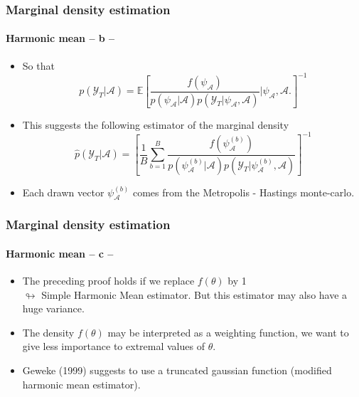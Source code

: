 \documentclass[10pt,slidestop]{beamer}
\newcommand{\sample}{\mathcal Y_T}
\begin{document}
\begin{frame}
  \frametitle{Marginal density estimation}
  \framesubtitle{Harmonic mean -- b --}


    \begin{itemize}
        \item So that
        \[
            p(\sample|\mathcal A)=\mathbb{E}\left[\frac{f(\psi_{\mathcal
A})}{p(\psi_{\mathcal A}|\mathcal A)
            p(\sample|\psi_{\mathcal A},\mathcal A)}\biggl|\psi_{\mathcal A},\mathcal
A\biggr.\right]^{-1}
        \]

\bigskip

        \item This suggests the following estimator of the marginal
        density
        \[
            \widehat{p}(\sample|\mathcal A)= \left[\frac{1}{B}\sum_{b=1}^B
            \frac{f(\psi_{\mathcal A}^{(b)})}{p(\psi_{\mathcal A}^{(b)}|\mathcal A)
            p(\sample|\psi_{\mathcal A}^{(b)},\mathcal A)}\right]^{-1}
        \]

\bigskip

        \item Each drawn vector $\psi_{\mathcal A}^{(b)}$ comes from the
        Metropolis - Hastings monte-carlo.

\end{itemize}

\end{frame}


\begin{frame}
  \frametitle{Marginal density estimation}
  \framesubtitle{Harmonic mean -- c --}

    \begin{itemize}
        \item The preceding proof holds if we replace
        $f(\theta)$ by 1\\ $\looparrowright$ Simple Harmonic Mean
        estimator. But this estimator may also have a huge
        variance.

\bigskip

        \item The density $f(\theta)$ may be interpreted as a
        weighting function, we want to give less importance to extremal values of
        $\theta$.

\bigskip

        \item Geweke (1999) suggests to use a truncated gaussian
        function (modified harmonic mean estimator).

    \end{itemize}

\end{frame}
\end{document}
